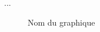 \usepackage{pgfplots}
...
\begin{figure}
  \begin{center}
    
  \end{center}
  \caption{Nom du graphique}
\end{figure}

